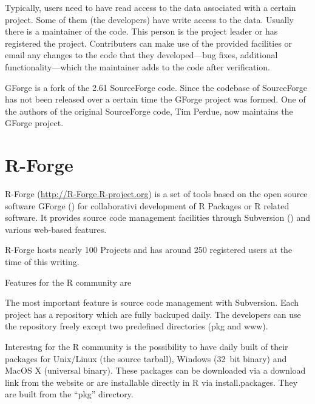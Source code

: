 Typically, users need to have read access to the data associated with
a certain project. Some of them (the developers) have write access to
the data. Usually there is a maintainer of the code. This person is the project
leader or has registered the project. Contributers can make use of the
provided facilities or email any changes to the code
that they developed---bug fixes, additional functionality---which the
maintainer adds to the code after verification.


GForge is a fork of the 2.61 SourceForge code. Since the codebase of
SourceForge has not been released over a certain time the GForge
project was formed. One of the authors of the original SourceForge
code, Tim Perdue, now maintains the GForge project.


\section*{R-Forge}
R-Forge (\url{http://R-Forge.R-project.org}) is a set of tools based
on the open source software GForge (\cite{manual:gforge})%
 for collaborativi development of R Packages or R
related software. It provides source code management facilities
through Subversion (\cite{subversion07}) and various web-based features. 

R-Forge hosts nearly 100 Projects and has around 250 registered users at the
time of this writing.




Features for the R community are 


The most important feature is source code management with
Subversion. Each project has a repository which are fully backuped
daily. The developers can use the repository
freely except two predefined directories (pkg and www). %

Interestng for the R community is the possibility to have daily built
of their packages for Unix/Linux (the source tarball), Windows
(32~bit binary) and MacOS X (universal binary). These packages can be
downloaded via a download link from the website or are installable
directly in R via install.packages. They are built from the ``pkg''
directory.

